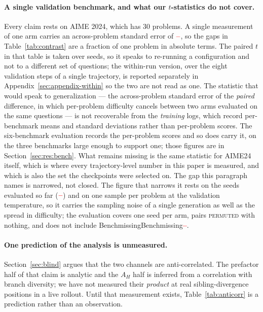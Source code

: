 \documentclass[11pt]{article}
\newcommand{\AH}{A_{H}}
\providecommand{\PENDING}{\textcolor{red}{\textbf{--}}}
\newcommand{\num}[1]{\ifcsname #1\endcsname\csname #1\endcsname\else\PENDING\fi}
\begin{document}
\paragraph{A single validation benchmark, and what our $t$-statistics do not cover.}
Every claim rests on AIME 2024, which has $30$ problems. A single measurement of one
arm carries an across-problem standard error of $\num{SEaime}$, so the gaps in
Table~\ref{tab:contrast} are a fraction of one problem in absolute terms. The paired
$t$ in that table is taken over seeds, so it speaks to re-running a configuration and
not to a different set of questions; the within-run version, over the eight
validation steps of a single trajectory, is reported separately in
Appendix~\ref{sec:appendix-within} so the two are not read as one. The statistic
that would speak to generalization --- the across-problem standard error of the
\emph{paired} difference, in which per-problem difficulty cancels between two arms
evaluated on the same questions --- is not recoverable from the \emph{training} logs,
which record per-benchmark means and standard deviations rather than per-problem
scores. The six-benchmark evaluation records the per-problem scores and so does carry
it, on the three benchmarks large enough to support one; those figures are in
Section~\ref{sec:res:bench}. What remains missing is the same statistic for AIME24
itself, which is where every trajectory-level number in this paper is measured, and
which is also the set the checkpoints were selected on. The gap this paragraph names
is narrowed, not closed. The figure that narrows it rests on the seeds evaluated so
far ($\num{Pairnseeds}$) and on one sample per problem at the validation temperature,
so it carries the sampling noise of a single generation as well as the spread in
difficulty; the evaluation covers one seed per arm, pairs \textsc{permuted} with
nothing, and does not include \num{Benchmissing}.

\paragraph{One prediction of the analysis is unmeasured.}
Section~\ref{sec:blind} argues that the two channels are anti-correlated. The
prefactor half of that claim is analytic and the $\AH$ half is inferred from a
correlation with branch diversity; we have not measured their \emph{product} at real
sibling-divergence positions in a live rollout. Until that measurement exists,
Table~\ref{tab:anticorr} is a prediction rather than an observation.
\end{document}
